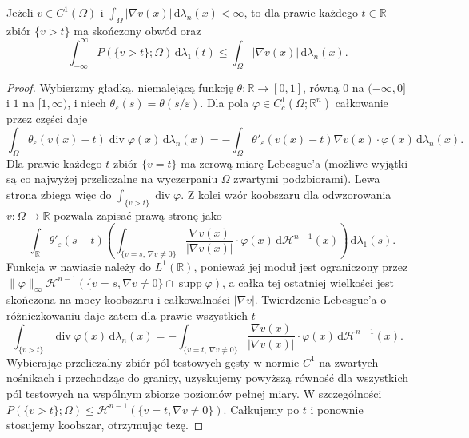\begin{lemat}
\label{lem:BV-smooth-levels}
Jeżeli $v\in C^1(\Omega)$ i
$\int_\Omega|\nabla v(x)|\,\mathrm d\lambda_n(x)<\infty$,
to dla prawie każdego $t\in\mathbb R$
zbiór $\{v>t\}$ ma skończony obwód oraz
\[
 \int_{-\infty}^{\infty}P(\{v>t\};\Omega)
 \,\mathrm d\lambda_1(t)
 \le\int_\Omega|\nabla v(x)|\,\mathrm d\lambda_n(x).
\]
\end{lemat}
\begin{proof}
Wybierzmy gładką, niemalejącą funkcję
$\theta:\mathbb R\to[0,1]$, równą $0$ na
$(-\infty,0]$ i $1$ na $[1,\infty)$, i niech
$\theta_\varepsilon(s)=\theta(s/\varepsilon)$.
Dla pola $\varphi\in C_c^1(\Omega;\mathbb R^n)$
całkowanie przez części daje
\[
 \int_\Omega\theta_\varepsilon(v(x)-t)
 \operatorname{div}\varphi(x)\,\mathrm d\lambda_n(x)
 =-\int_\Omega\theta'_\varepsilon(v(x)-t)
 \nabla v(x)\cdot\varphi(x)\,\mathrm d\lambda_n(x).
\]
Dla prawie każdego $t$ zbiór $\{v=t\}$ ma
zerową miarę Lebesgue'a (możliwe wyjątki
są co najwyżej przeliczalne na wyczerpaniu
$\Omega$ zwartymi podzbiorami). Lewa strona
zbiega więc do $\int_{\{v>t\}}\operatorname{div}\varphi$.
Z kolei wzór koobszaru dla odwzorowania
$v:\Omega\to\mathbb R$ pozwala zapisać
prawą stronę jako
\[
 -\int_{\mathbb R}\theta'_\varepsilon(s-t)
 \left(\int_{\{v=s,\,\nabla v\ne0\}}
 \frac{\nabla v(x)}{|\nabla v(x)|}\cdot\varphi(x)
 \,\mathrm d\mathcal H^{n-1}(x)\right)
 \,\mathrm d\lambda_1(s).
\]
Funkcja w nawiasie należy do $L^1(\mathbb R)$,
ponieważ jej moduł jest ograniczony przez
$\|\varphi\|_\infty\mathcal H^{n-1}
(\{v=s,\nabla v\ne0\}\cap\operatorname{supp}\varphi)$,
a całka tej ostatniej wielkości jest skończona
na mocy koobszaru i całkowalności $|\nabla v|$.
Twierdzenie Lebesgue'a o różniczkowaniu daje
zatem dla prawie wszystkich $t$
\[
 \int_{\{v>t\}}\operatorname{div}\varphi(x)
 \,\mathrm d\lambda_n(x)
 =-\int_{\{v=t,\,\nabla v\ne0\}}
 \frac{\nabla v(x)}{|\nabla v(x)|}\cdot\varphi(x)
 \,\mathrm d\mathcal H^{n-1}(x).
\]
Wybierając przeliczalny zbiór pól testowych
gęsty w normie $C^1$ na zwartych nośnikach
i przechodząc do granicy, uzyskujemy powyższą
równość dla wszystkich pól testowych na
wspólnym zbiorze poziomów pełnej miary.
W szczególności
$P(\{v>t\};\Omega)\le
\mathcal H^{n-1}(\{v=t,\nabla v\ne0\})$.
Całkujemy po $t$ i ponownie stosujemy koobszar,
otrzymując tezę.
\end{proof}

